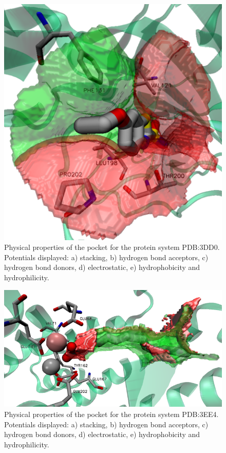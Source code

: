    \begin{figure}[H]
      \centering
      \includegraphics[width=1\textwidth]{figures/results/benchmark_prot/3dd0.png}
      \caption{\label{fig:benchmark/3dd0} Physical properties of the pocket for the protein system PDB:3DD0. Potentials displayed: a) stacking, b) hydrogen bond acceptors, c) hydrogen bond donors, d) electrostatic, e) hydrophobicity and hydrophilicity.}
    \end{figure}

    \begin{figure}[H]
      \centering
      \includegraphics[width=1\textwidth]{figures/results/benchmark_prot/3ee4.png}
      \caption{\label{fig:benchmark/3ee4} Physical properties of the pocket for the protein system PDB:3EE4. Potentials displayed: a) stacking, b) hydrogen bond acceptors, c) hydrogen bond donors, d) electrostatic, e) hydrophobicity and hydrophilicity.}
    \end{figure}

